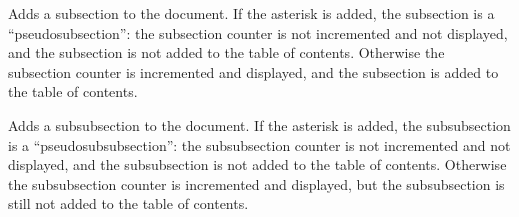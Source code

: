 Adds a subsection to the document.
If the asterisk is added, the subsection is a ``pseudosubsection'': the subsection counter is not incremented and not displayed, and the subsection is not added to the table of contents.
Otherwise the subsection counter is incremented and displayed, and the subsection is added to the table of contents.
\emacroexp

Adds a subsubsection to the document.
If the asterisk is added, the subsubsection is a ``pseudosubsubsection'': the subsubsection counter is not incremented and not displayed, and the subsubsection is not added to the table of contents.
Otherwise the subsubsection counter is incremented and displayed, but the subsubsection is still not added to the table of contents.
\emacroexp

